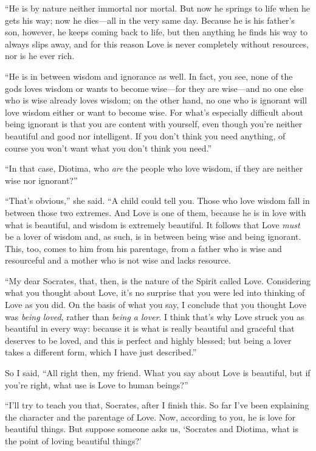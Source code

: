  “He is by nature neither immortal nor mortal. But now he springs
to life when he gets his way; now he dies---all in the very same day.
Because he is his father's son, however, he keeps coming back to life,
but then anything he finds his way to always slips away, and for this
reason Love is never completely without resources, nor is he ever rich.

 “He is in between wisdom and ignorance as well. In fact,
you see, none of the gods loves wisdom or wants to become wise---for
they are wise---and no one else who is wise already loves wisdom; on the
other hand, no one who is ignorant will love wisdom either or want to
become wise. For what's especially difficult about being ignorant is
that you are content with yourself, even though you're neither beautiful
and good nor intelligent. If you don't think you need anything, of
course you won't want what you don't think you need.”

“In that case, Diotima, who {\em are} the people who love wisdom, if
they are  neither wise nor ignorant?”

“That's obvious,” she said. “A child could tell you. Those who love
wisdom fall in between those two extremes. And Love is one of them,
because he is in love with what is beautiful, and wisdom is extremely
beautiful. It follows that Love {\em must} be a lover of wisdom and, as
such, is in between being wise and being ignorant. This, too, comes to
him from his parentage, from a father who is wise and resourceful and a
mother who is not wise and lacks resource.

“My dear Socrates, that, then, is the nature of the Spirit called Love.
 Considering what you thought about Love, it's no surprise that
you were led into thinking of Love as you did. On the basis of what you
say, I conclude that you thought Love was {\em being loved}, rather than
{\em being a lover}. I think that's why Love struck you as beautiful in
every way: because it is what is really beautiful and graceful that
deserves to be loved, and this is perfect and highly blessed; but being
a lover takes a different form, which I have just described.”

So I said, “All right then, my friend. What you say about Love is
beautiful, but if you're right, what use is Love to human beings?”

“I'll try to teach you that, Socrates, after I finish this. So far I've
been explaining the character and the parentage of Love. Now, according
to you, he is love for beautiful things. But suppose someone asks us,
‘Socrates and Diotima, what is the point of loving beautiful things?'

